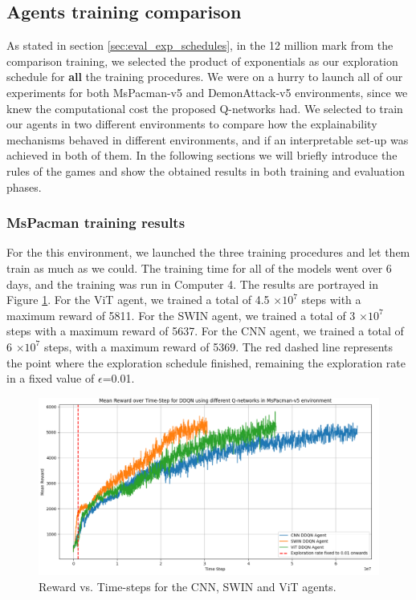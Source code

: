 \subsection{Agents training comparison}
\label{sec:eval_comp_models}
As stated in section \ref{sec:eval_exp_schedules}, in the 12 million mark from the comparison training, we selected the product of exponentials as our exploration schedule for \textbf{all} the training procedures. We were on a hurry to launch all of our experiments for both MsPacman-v5 and DemonAttack-v5 environments, since we knew the computational cost the proposed Q-networks had. We selected to train our agents in two different environments to compare how the explainability mechanisms behaved in different environments, and if an interpretable set-up was achieved in both of them. In the following sections we will briefly introduce the rules of the games and show the obtained results in both training and evaluation phases.

\subsubsection{MsPacman training results}
\label{sec:mspacman-training-results}
For the this environment, we launched the three training procedures and let them train as much as we could. The training time for all of the models went over 6 days, and the training was run in Computer 4. The results are portrayed in Figure \ref{fig:pacmanfinalresults}. For the ViT agent, we trained a total of 4.5 $\times 10^7$ steps with a maximum reward of 5811. For the SWIN agent, we trained a total of 3 $\times 10^7$ steps with a maximum reward of 5637. For the CNN agent, we trained a total of 6 $\times 10 ^7$ steps, with a maximum reward of 5369. The red dashed line represents the point where the exploration schedule finished, remaining the exploration rate in a fixed value of $\epsilon$=0.01. 

\begin{figure}[!h]
	\centering
	\includegraphics[width=0.9\linewidth]{figures/pacman_final_results}
	\caption{Reward vs. Time-steps for the CNN, SWIN and ViT agents.}
	\label{fig:pacmanfinalresults}
\end{figure}

